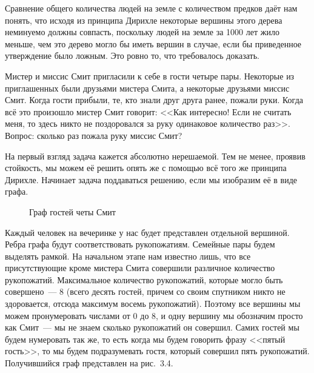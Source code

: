 \begin{example}
Сравнение общего количества людей на земле с количеством предков даёт нам понять, что исходя из принципа Дирихле некоторые вершины этого дерева неминуемо должны совпасть, поскольку людей на земле за 1000 лет жило меньше, чем это дерево могло бы иметь вершин в случае, если бы приведенное утверждение было ложным. Это ровно то, что требовалось доказать.
\end{example}

\begin{example}
Мистер и миссис Смит пригласили к себе в гости четыре пары. Некоторые из приглашенных были друзьями мистера Смита, а некоторые друзьями миссис Смит. Когда гости прибыли, те, кто знали друг друга ранее, пожали руки. Когда всё это произошло мистер Смит говорит: <<Как интересно! Если не считать меня, то здесь никто не поздоровался за руку одинаковое количество раз>>. Вопрос: сколько раз пожала руку миссис Смит?

На первый взгляд задача кажется абсолютно нерешаемой. Тем не менее, проявив стойкость, мы можем её решить опять же с помощью всё того же принципа Дирихле. Начинает задача поддаваться решению, если мы изобразим её в виде графа.

\begin{figure}[h]
\centering
{}
\caption{Граф гостей четы Смит}
\end{figure}

Каждый человек на вечеринке у нас будет представлен отдельной вершиной. Ребра графа будут соответствовать рукопожатиям. Семейные пары будем выделять рамкой. На начальном этапе нам известно лишь, что все присутствующие кроме мистера Смита совершили различное количество рукопожатий. Максимальное количество рукопожатий, которые могло быть совершено~--- 8 (всего десять гостей, причем со своим спутником никто не здоровается, отсюда максимум восемь рукопожатий). Поэтому все вершины мы можем пронумеровать числами от 0 до 8, и одну вершину мы обозначим просто как Смит~--- мы не знаем сколько рукопожатий он совершил. Самих гостей мы будем нумеровать так же, то есть когда мы будем говорить фразу <<пятый гость>>, то мы будем подразумевать гостя, который совершил пять рукопожатий. Получившийся граф представлен на рис.~3.4.


\end{example}
